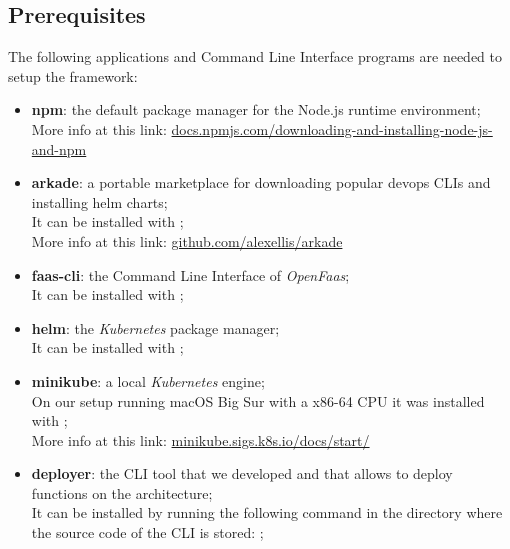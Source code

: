 \subsection{Prerequisites}
The following applications and Command Line Interface programs are needed to setup the framework:
\begin{itemize}
    \item \textbf{npm}: the default package manager for the Node.js runtime environment;
    \\More info at this link: \href{https://docs.npmjs.com/downloading-and-installing-node-js-and-npm#using-a-node-version-manager-to-install-nodejs-and-npm}{docs.npmjs.com/downloading-and-installing-node-js-and-npm}

    \item \textbf{arkade}: a portable marketplace for downloading popular devops CLIs and installing helm charts;
    \\It can be installed with ;
    \\More info at this link: \href{https://github.com/alexellis/arkade}{github.com/alexellis/arkade}
    
    \item \textbf{faas-cli}: the Command Line Interface of \textit{OpenFaas};
    \\It can be installed with ;
    
    \item \textbf{helm}: the \textit{Kubernetes} package manager;
    \\It can be installed with ;
    
    \item \textbf{minikube}: a local \textit{Kubernetes} engine;
    \\On our setup running macOS Big Sur with a x86-64 CPU it was installed with ;
    \\More info at this link: \href{https://minikube.sigs.k8s.io/docs/start/}{minikube.sigs.k8s.io/docs/start/}
    
    \item \textbf{deployer}: the CLI tool that we developed and that allows to deploy functions on the architecture;
    \\It can be installed by running the following command in the directory where the source code of the CLI is stored: ;
\end{itemize}


